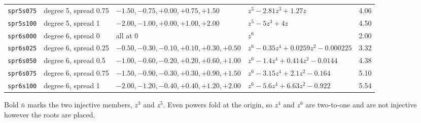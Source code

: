 \begin{center}
\begin{tabular}{@{}llll r@{}}
\texttt{spr5s075} & degree 5, spread 0.75 & $-1.50,-0.75,+0.00,+0.75,+1.50$ & $z^{5} - 2.81z^{3} + 1.27z$ & 4.06 \\
\texttt{spr5s100} & degree 5, spread 1 & $-2.00,-1.00,+0.00,+1.00,+2.00$ & $z^{5} - 5z^{3} + 4z$ & 4.50 \\
\addlinespace
\texttt{spr6s000} & degree 6, spread 0 & all at $0$ & $z^{6}$ & 2.00 \\
\texttt{spr6s025} & degree 6, spread 0.25 & $-0.50,-0.30,-0.10,+0.10,+0.30,+0.50$ & $z^{6} - 0.35z^{4} + 0.0259z^{2} - 0.000225$ & 3.32 \\
\texttt{spr6s050} & degree 6, spread 0.5 & $-1.00,-0.60,-0.20,+0.20,+0.60,+1.00$ & $z^{6} - 1.4z^{4} + 0.414z^{2} - 0.0144$ & 4.38 \\
\texttt{spr6s075} & degree 6, spread 0.75 & $-1.50,-0.90,-0.30,+0.30,+0.90,+1.50$ & $z^{6} - 3.15z^{4} + 2.1z^{2} - 0.164$ & 5.10 \\
\texttt{spr6s100} & degree 6, spread 1 & $-2.00,-1.20,-0.40,+0.40,+1.20,+2.00$ & $z^{6} - 5.6z^{4} + 6.63z^{2} - 0.922$ & 5.54 \\
\bottomrule
\end{tabular}
\end{center}

\noindent Bold $\bar n$ marks the two injective members, $z^3$ and $z^5$.
Even powers fold at the origin, so $z^4$ and $z^6$ are two-to-one and are not
injective however the roots are placed.
